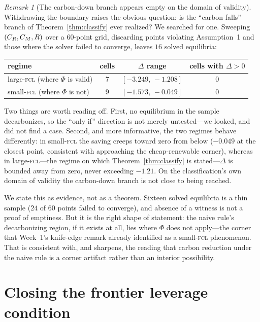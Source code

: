 \documentclass[11pt,reqno]{amsart}
\theoremstyle{plain}
\theoremstyle{definition}
\theoremstyle{remark}
\newtheorem{remark}{Remark}
\theoremstyle{remark}\newtheorem{observation}{Observation}
\begin{document}
\begin{remark}[The carbon-down branch appears empty on the domain of validity]
\label{rem:emptybranch}
Withdrawing the boundary raises the obvious question: is the ``carbon falls'' branch of
Theorem~\ref{thm:classify} ever realized? We searched for one. Sweeping $(C_R,C_M,R)$ over a
$60$-point grid, discarding points violating Assumption~1 and those where the solver failed
to converge, leaves $16$ solved equilibria:
\begin{center}\small
\begin{tabular}{lccc}
\toprule
regime & cells & $\Delta$ range & cells with $\Delta>0$\\
\midrule
large-\textsc{fcl} (where $\Phi$ is valid) & $7$ & $[-3.249,\,-1.208]$ & $0$\\
small-\textsc{fcl} (where $\Phi$ is not)   & $9$ & $[-1.573,\,-0.049]$ & $0$\\
\bottomrule
\end{tabular}
\end{center}
Two things are worth reading off. First, no equilibrium in the sample decarbonizes, so the
``only if'' direction is not merely untested---we looked, and did not find a case. Second,
and more informative, the two regimes behave differently: in small-\textsc{fcl} the saving
creeps toward zero from below ($-0.049$ at the closest point, consistent with approaching
the cheap-renewable corner), whereas in large-\textsc{fcl}---the regime on which
Theorem~\ref{thm:classify} is stated---$\Delta$ is bounded away from zero, never exceeding
$-1.21$. On the classification's own domain of validity the carbon-down branch is not close
to being reached.

We state this as evidence, not as a theorem. Sixteen solved equilibria is a thin sample
($24$ of $60$ points failed to converge), and absence of a witness is not a proof of
emptiness. But it is the right shape of statement: the naive rule's decarbonizing region, if
it exists at all, lies where $\Phi$ does not apply---the corner that Week~1's knife-edge remark already identified as a
small-\textsc{fcl} phenomenon. That is
consistent with, and sharpens, the reading that carbon reduction under the naive rule is a
corner artifact rather than an interior possibility.
\end{remark}

\section{Closing the frontier leverage condition}\label{sec:leverage}
\end{document}
